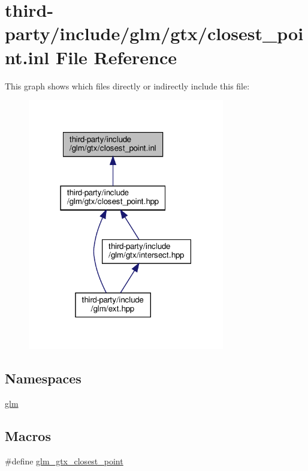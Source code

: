 \hypertarget{closest__point_8inl}{}\section{third-\/party/include/glm/gtx/closest\+\_\+point.inl File Reference}
\label{closest__point_8inl}
This graph shows which files directly or indirectly include this file\+:
\nopagebreak
\begin{figure}[H]
\begin{center}
\leavevmode
\includegraphics[width=243pt]{closest__point_8inl__dep__incl}
\end{center}
\end{figure}
\subsection*{Namespaces}
\begin{DoxyCompactItemize}
\item 
 \hyperlink{namespaceglm}{glm}
\end{DoxyCompactItemize}
\subsection*{Macros}
\begin{DoxyCompactItemize}
\item 
\#define \hyperlink{closest__point_8inl_af884ff4983e76fd2ef24511db8e29251}{glm\+\_\+gtx\+\_\+closest\+\_\+point}
\end{DoxyCompactItemize}
